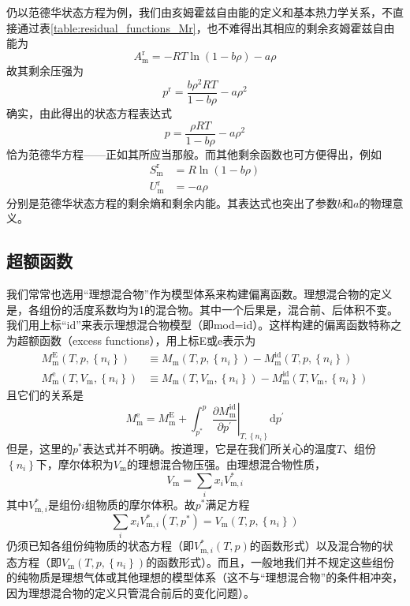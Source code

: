 \documentclass[main.tex]{subfiles}
\begin{document}
仍以范德华状态方程为例，我们由亥姆霍兹自由能的定义和基本热力学关系，不直接通过表\ref{table:residual_functions_Mr}，也不难得出其相应的剩余亥姆霍兹自由能为
\[A^\text{r}_\text{m}=-RT\ln\left(1-b\rho\right)-a\rho\]
故其剩余压强为
\[p^\text{r}=\frac{b\rho^2RT}{1-b\rho}-a\rho^2\]
确实，由此得出的状态方程表达式
\[p=\frac{\rho RT}{1-b\rho}-a\rho^2\]
恰为范德华方程——正如其所应当那般。而其他剩余函数也可方便得出，例如
\begin{align*}
    S^\text{r}_\text{m} & =R\ln\left(1-b\rho\right) \\
    U^\text{r}_\text{m} & =-a\rho
\end{align*}
分别是范德华状态方程的剩余熵和剩余内能。其表达式也突出了参数$b$和$a$的物理意义。





\subsection{超额函数}
我们常常也选用“理想混合物”作为模型体系来构建偏离函数。理想混合物的定义是，各组份的活度系数均为1的混合物。其中一个后果是，混合前、后体积不变。我们用上标“id”来表示理想混合物模型（即mod=id）。这样构建的偏离函数特称之为超额函数（excess functions），用上标E或e表示为
\begin{align}
    \label{eq:def_excess_functions_E}
    M^\text{E}_\text{m}\left(T,p,\left\{n_i\right\}\right)          & \equiv M_\text{m}\left(T,p,\left\{n_i\right\}\right)-M^\text{id}_\text{m}\left(T,p,\left\{n_i\right\}\right)                   \\
    \label{eq:def_excess_functions_e}
    M^\text{e}_\text{m}\left(T,V_\text{m},\left\{n_i\right\}\right) & \equiv M_\text{m}\left(T,V_\text{m},\left\{n_i\right\}\right)-M^\text{id}_\text{m}\left(T,V_\text{m},\left\{n_i\right\}\right)
\end{align}
且它们的关系是
\begin{equation}
    \label{eq:rel_ME_Me}
    M^\text{e}_\text{m}=M^\text{E}_\text{m}+\int_{p^*}^p\left.\frac{\partial M^\text{id}_\text{m}}{\partial p^\prime}\right|_{T,\left\{n_i\right\}}\mathrm{d}p^\prime
\end{equation}
但是，这里的$p^*$表达式并不明确。按道理，它是在我们所关心的温度$T$、组份$\left\{n_i\right\}$下，摩尔体积为$V_\text{m}$的理想混合物压强。由理想混合物性质，
\[V_\text{m}=\sum_i x_i V^*_{\text{m},i}\]
其中$V^*_{\text{m},i}$是组份$i$组物质的摩尔体积。故$p^*$满足方程
\[\sum_i x_i V^*_{\text{m},i}\left(T,p^*\right)=V_\text{m}\left(T,p,\left\{n_i\right\}\right)\]
仍须已知各组份纯物质的状态方程（即$V^*_{\text{m},i}\left(T,p\right)$的函数形式）以及混合物的状态方程（即$V_\text{m}\left(T,p,\left\{n_i\right\}\right)$的函数形式）。而且，一般地我们并不规定这些组份的纯物质是理想气体或其他理想的模型体系（这不与“理想混合物”的条件相冲突，因为理想混合物的定义只管混合前后的变化问题）。
\end{document}
